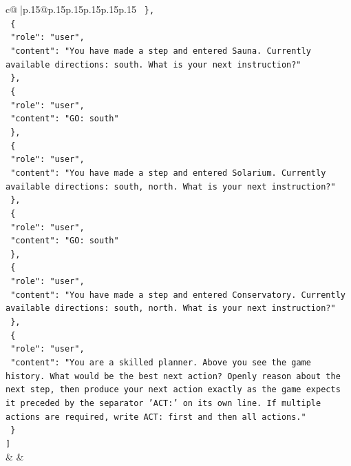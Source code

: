\documentclass{article}
\begin{document}
{\begin{supertabular}{c@{$\;$}|p{.15\linewidth}@{}p{.15\linewidth}p{.15\linewidth}p{.15\linewidth}p{.15\linewidth}p{.15\linewidth}}
{{{\texttt{  \},} \\
\texttt{  \{} \\
\texttt{    "role": "user",} \\
\texttt{    "content": "You have made a step and entered Sauna. Currently available directions: south. What is your next instruction?"} \\
\texttt{  \},} \\
\texttt{  \{} \\
\texttt{    "role": "user",} \\
\texttt{    "content": "GO: south"} \\
\texttt{  \},} \\
\texttt{  \{} \\
\texttt{    "role": "user",} \\
\texttt{    "content": "You have made a step and entered Solarium. Currently available directions: south, north. What is your next instruction?"} \\
\texttt{  \},} \\
\texttt{  \{} \\
\texttt{    "role": "user",} \\
\texttt{    "content": "GO: south"} \\
\texttt{  \},} \\
\texttt{  \{} \\
\texttt{    "role": "user",} \\
\texttt{    "content": "You have made a step and entered Conservatory. Currently available directions: south, north. What is your next instruction?"} \\
\texttt{  \},} \\
\texttt{  \{} \\
\texttt{    "role": "user",} \\
\texttt{    "content": "You are a skilled planner. Above you see the game history. What would be the best next action? Openly reason about the next step, then produce your next action exactly as the game expects it preceded by the separator 'ACT:' on its own line. If multiple actions are required, write ACT: first and then all actions."} \\
\texttt{  \}} \\
\texttt{{]}} \\
            }
        }
    }
    & & \\ \\


\end{supertabular}}
\end{document}
